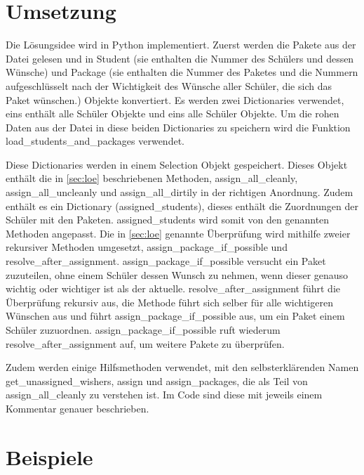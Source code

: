 \documentclass[a4paper,10pt,ngerman]{scrartcl}
\begin{document}
\section{Umsetzung}

Die Lösungsidee wird in Python implementiert.
Zuerst werden die Pakete aus der Datei gelesen und in Student (sie enthalten die Nummer des Schülers und dessen Wünsche) und Package (sie enthalten die Nummer des Paketes und die Nummern aufgeschlüsselt nach der Wichtigkeit des Wünsche aller Schüler, die sich das Paket wünschen.) Objekte konvertiert.
Es werden zwei Dictionaries verwendet, eins enthält alle Schüler Objekte und eins alle Schüler Objekte.
Um die rohen Daten aus der Datei in diese beiden Dictionaries zu speichern wird die Funktion load\_students\_and\_packages verwendet.

Diese Dictionaries werden in einem Selection Objekt gespeichert.
Dieses Objekt enthält die in \autoref{sec:loe} beschriebenen Methoden, assign\_all\_cleanly, assign\_all\_uncleanly und assign\_all\_dirtily in der richtigen Anordnung.
Zudem enthält es ein Dictionary (assigned\_students), dieses enthält die Zuordnungen der Schüler mit den Paketen.
assigned\_students wird somit von den genannten Methoden angepasst.
Die in \autoref{sec:loe} genannte Überprüfung wird mithilfe zweier rekursiver Methoden umgesetzt, assign\_package\_if\_possible und resolve\_after\_assignment.
assign\_package\_if\_possible versucht ein Paket zuzuteilen, ohne einem Schüler dessen Wunsch zu nehmen, wenn dieser genauso wichtig oder wichtiger ist als der aktuelle.
resolve\_after\_assignment führt die Überprüfung rekursiv aus, die Methode führt sich selber für alle wichtigeren Wünschen aus und führt assign\_package\_if\_possible aus, um ein Paket einem Schüler zuzuordnen.
assign\_package\_if\_possible ruft wiederum resolve\_after\_assignment auf, um weitere Pakete zu überprüfen.

Zudem werden einige Hilfsmethoden verwendet, mit den selbsterklärenden Namen get\_unassigned\_wishers, assign und assign\_packages, die als Teil von assign\_all\_cleanly zu verstehen ist.
Im Code sind diese mit jeweils einem Kommentar genauer beschrieben.

\section{Beispiele}
\end{document}
